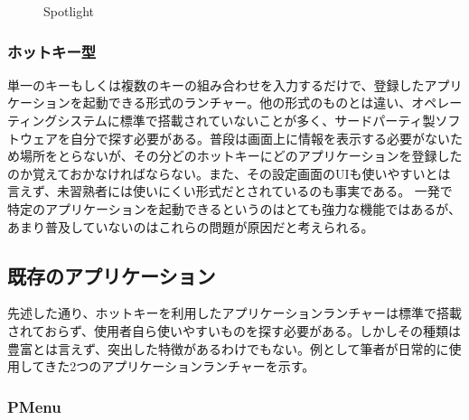 \begin{figure}[h]
    \begin{center}
    \end{center}
    \caption{Spotlight}
    \label{fig:spotlight}
\end{figure}

\subsubsection{ホットキー型}

単一のキーもしくは複数のキーの組み合わせを入力するだけで、登録したアプリケーションを起動できる形式のランチャー。他の形式のものとは違い、オペレーティングシステムに標準で搭載されていないことが多く、サードパーティ製ソフトウェアを自分で探す必要がある。普段は画面上に情報を表示する必要がないため場所をとらないが、その分どのホットキーにどのアプリケーションを登録したのか覚えておかなければならない。また、その設定画面のUIも使いやすいとは言えず、未習熟者には使いにくい形式だとされているのも事実である。
一発で特定のアプリケーションを起動できるというのはとても強力な機能ではあるが、あまり普及していないのはこれらの問題が原因だと考えられる。

\subsection{既存のアプリケーション}

先述した通り、ホットキーを利用したアプリケーションランチャーは標準で搭載されておらず、使用者自ら使いやすいものを探す必要がある。しかしその種類は豊富とは言えず、突出した特徴があるわけでもない。例として筆者が日常的に使用してきた2つのアプリケーションランチャーを示す。

\subsubsection{PMenu}

